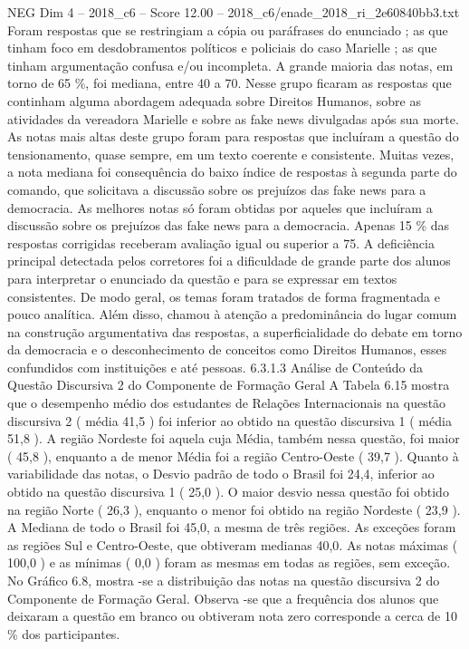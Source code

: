 \begin{textsample}{NEG Dim 4 – 2018\_c6 – Score 12.00 – 2018\_c6/enade\_2018\_ri\_2e60840bb3.txt}
Foram respostas que se restringiam a cópia ou paráfrases do enunciado ; as que tinham foco em desdobramentos políticos e policiais do caso Marielle ; as que tinham argumentação confusa e/ou incompleta.
A grande maioria das notas, em torno de 65 \%, foi mediana, entre 40 a 70.
Nesse grupo ficaram as respostas que continham alguma abordagem adequada sobre Direitos Humanos, sobre as atividades da vereadora Marielle e sobre as fake news divulgadas após sua morte.
As notas mais altas deste grupo foram para respostas que incluíram a questão do tensionamento, quase sempre, em um texto coerente e consistente.
Muitas vezes, a nota mediana foi consequência do baixo índice de respostas à segunda parte do comando, que solicitava a discussão sobre os prejuízos das fake news para a democracia.
As melhores notas só foram obtidas por aqueles que incluíram a discussão sobre os prejuízos das fake news para a democracia.
Apenas 15 \% das respostas corrigidas receberam avaliação igual ou superior a 75.
A deficiência principal detectada pelos corretores foi a dificuldade de grande parte dos alunos para interpretar o enunciado da questão e para se expressar em textos consistentes.
De modo geral, os temas foram tratados de forma fragmentada e pouco analítica.
Além disso, chamou à atenção a predominância do lugar comum na construção argumentativa das respostas, a superficialidade do debate em torno da democracia e o desconhecimento de conceitos como Direitos Humanos, esses confundidos com instituições e até pessoas. 6.3.1.3 Análise de Conteúdo da Questão Discursiva 2 do Componente de Formação Geral A Tabela 6.15 mostra que o desempenho médio dos estudantes de Relações Internacionais na questão discursiva 2 ( média 41,5 ) foi inferior ao obtido na questão discursiva 1 ( média 51,8 ).
A região Nordeste foi aquela cuja Média, também nessa questão, foi maior ( 45,8 ), enquanto a de menor Média foi a região Centro-Oeste ( 39,7 ).
Quanto à variabilidade das notas, o Desvio padrão de todo o Brasil foi 24,4, inferior ao obtido na questão discursiva 1 ( 25,0 ).
O maior desvio nessa questão foi obtido na região Norte ( 26,3 ), enquanto o menor foi obtido na região Nordeste ( 23,9 ).
A Mediana de todo o Brasil foi 45,0, a mesma de três regiões.
As exceções foram as regiões Sul e Centro-Oeste, que obtiveram medianas 40,0.
As notas máximas ( 100,0 ) e as mínimas ( 0,0 ) foram as mesmas em todas as regiões, sem exceção.
No Gráfico 6.8, mostra -se a distribuição das notas na questão discursiva 2 do Componente de Formação Geral.
Observa -se que a frequência dos alunos que deixaram a questão em branco ou obtiveram nota zero corresponde a cerca de 10 \% dos participantes.

\end{textsample}
